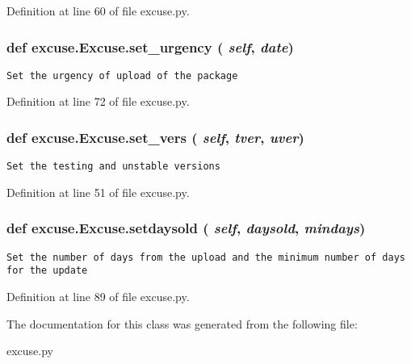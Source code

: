 Definition at line 60 of file excuse.py.
\subsubsection{\setlength{\rightskip}{0pt plus 5cm}def excuse.Excuse.set\_\-urgency ( {\em self},  {\em date})}\label{classexcuse_1_1Excuse_c504d40ac6d07ffdb08b7ff8ed555d10}




\footnotesize\begin{verbatim}Set the urgency of upload of the package\end{verbatim}
\normalsize
 

Definition at line 72 of file excuse.py.
\subsubsection{\setlength{\rightskip}{0pt plus 5cm}def excuse.Excuse.set\_\-vers ( {\em self},  {\em tver},  {\em uver})}\label{classexcuse_1_1Excuse_b8751fc5d0033b4c734c476d92841d99}




\footnotesize\begin{verbatim}Set the testing and unstable versions\end{verbatim}
\normalsize
 

Definition at line 51 of file excuse.py.
\subsubsection{\setlength{\rightskip}{0pt plus 5cm}def excuse.Excuse.setdaysold ( {\em self},  {\em daysold},  {\em mindays})}\label{classexcuse_1_1Excuse_cf1fa7c6fb741bbe7e3120113748f3a5}




\footnotesize\begin{verbatim}Set the number of days from the upload and the minimum number of days for the update\end{verbatim}
\normalsize
 

Definition at line 89 of file excuse.py.

The documentation for this class was generated from the following file:\begin{CompactItemize}
\item 
excuse.py\end{CompactItemize}
